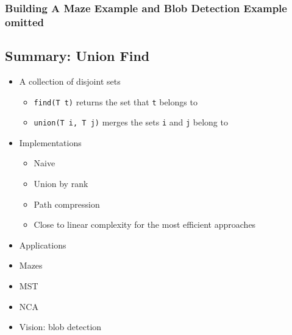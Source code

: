 \documentclass[
  10pt,
  english,
  letterpaper,
,tablecaptionabove
]{scrartcl}
\newcommand{\passthrough}[1]{#1}
\providecommand{\tightlist}{%
  \setlength{\itemsep}{0pt}\setlength{\parskip}{0pt}}
\begin{document}
\hypertarget{building-a-maze-example-and-blob-detection-example-omitted}{%
\subsubsection{Building A Maze Example and Blob Detection Example
omitted}\label{building-a-maze-example-and-blob-detection-example-omitted}}

\hypertarget{summary-union-find}{%
\subsection{Summary: Union Find}\label{summary-union-find}}

\begin{itemize}
\tightlist
\item
  A collection of disjoint sets

  \begin{itemize}
  \tightlist
  \item
    \passthrough{\lstinline!find(T t)!} returns the set that
    \passthrough{\lstinline!t!} belongs to
  \item
    \passthrough{\lstinline!union(T i, T j)!} merges the sets
    \passthrough{\lstinline!i!} and \passthrough{\lstinline!j!} belong
    to
  \end{itemize}
\item
  Implementations

  \begin{itemize}
  \tightlist
  \item
    Naive
  \item
    Union by rank
  \item
    Path compression
  \item
    Close to linear complexity for the most efficient approaches
  \end{itemize}
\item
  Applications
\item
  Mazes
\item
  MST
\item
  NCA
\item
  Vision: blob detection
\end{itemize}
\end{document}
